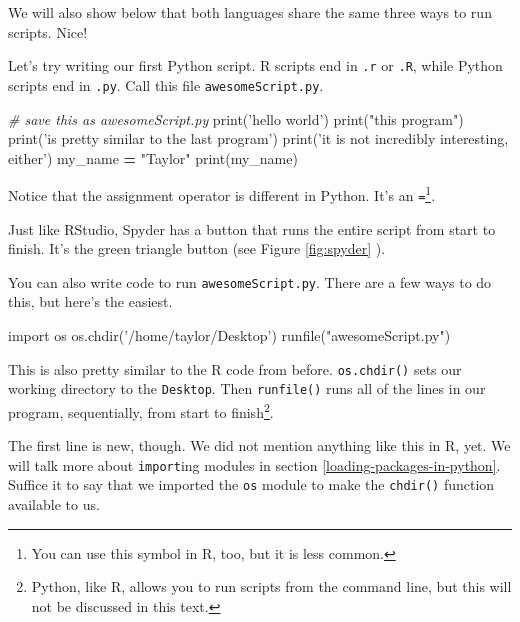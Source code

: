 \documentclass[12pt,krantz2]{krantz}
\makeatletter
\newenvironment{Shaded}{\begin{snugshade}}{\end{snugshade}}
\newcommand{\BuiltInTok}[1]{#1}
\newcommand{\CommentTok}[1]{\textcolor[rgb]{0.37,0.37,0.37}{\textit{#1}}}
\newcommand{\ImportTok}[1]{#1}
\newcommand{\NormalTok}[1]{#1}
\newcommand{\OperatorTok}[1]{\textcolor[rgb]{0.43,0.43,0.43}{\textbf{#1}}}
\newcommand{\StringTok}[1]{\textcolor[rgb]{0.5,0.5,0.5}{#1}}
\newenvironment{kframe}{%
\medskip{}
\setlength{\fboxsep}{.8em}
 \def\at@end@of@kframe{}%
 \ifinner\ifhmode%
  \def\at@end@of@kframe{\end{minipage}}%
  \begin{minipage}{\columnwidth}%
 \fi\fi%
 \def\FrameCommand##1{\hskip\@totalleftmargin \hskip-\fboxsep
 \colorbox{shadecolor}{##1}\hskip-\fboxsep
     \hskip-\linewidth \hskip-\@totalleftmargin \hskip\columnwidth}%
 \MakeFramed {\advance\hsize-\width
   \@totalleftmargin\z@ \linewidth\hsize
   \@setminipage}}%
 {\par\unskip\endMakeFramed%
 \at@end@of@kframe}
\renewenvironment{Shaded}{\begin{kframe}}{\end{kframe}}
\makeatother
\begin{document}
We will also show below that both languages share the same three ways to run scripts. Nice!

Let's try writing our first Python script. R scripts end in \texttt{.r} or \texttt{.R}, while Python scripts end in \texttt{.py}. Call this file \texttt{awesomeScript.py}.

\begin{Shaded}
\begin{Highlighting}[]
\CommentTok{# save this as awesomeScript.py}
\BuiltInTok{print}\NormalTok{(}\StringTok{'hello world'}\NormalTok{)}
\BuiltInTok{print}\NormalTok{(}\StringTok{"this program"}\NormalTok{)}
\BuiltInTok{print}\NormalTok{(}\StringTok{'is pretty similar to the last program'}\NormalTok{)}
\BuiltInTok{print}\NormalTok{(}\StringTok{'it is not incredibly interesting, either'}\NormalTok{)}
\NormalTok{my_name }\OperatorTok{=} \StringTok{"Taylor"}
\BuiltInTok{print}\NormalTok{(my_name)}
\end{Highlighting}
\end{Shaded}

Notice that the assignment operator is different in Python. It's an \texttt{=}\footnote{You can use this symbol in R, too, but it is less common.}.

Just like RStudio, Spyder has a button that runs the entire script from start to finish. It's the green triangle button (see Figure \ref{fig:spyder} ).

You can also write code to run \texttt{awesomeScript.py}. There are a few ways to do this, but here's the easiest.

\begin{Shaded}
\begin{Highlighting}[]
\ImportTok{import}\NormalTok{ os}
\NormalTok{os.chdir(}\StringTok{'/home/taylor/Desktop'}\NormalTok{)}
\NormalTok{runfile(}\StringTok{"awesomeScript.py"}\NormalTok{)}
\end{Highlighting}
\end{Shaded}

This is also pretty similar to the R code from before. \texttt{os.chdir()} sets our working directory to the \texttt{Desktop}. Then \texttt{runfile()} runs all of the lines in our program, sequentially, from start to finish\footnote{Python, like R, allows you to run scripts from the command line, but this will not be discussed in this text.}.

The first line is new, though. We did not mention anything like this in R, yet. We will talk more about \texttt{import}ing modules in section \ref{loading-packages-in-python}. Suffice it to say that we imported the \texttt{os} module to make the \texttt{chdir()} function available to us.
\end{document}
